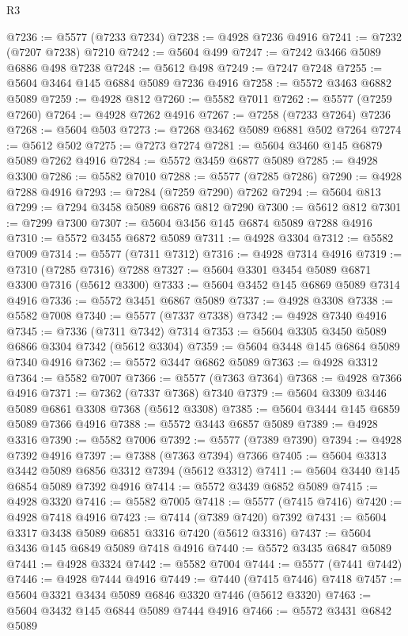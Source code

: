 \begin{lexlean}{R3}
\begin{coremodule}
@7236 := @5577 (@7233 @7234)
@7238 := @4928 @7236 @4916
@7241 := @7232 (@7207 @7238) @7210
@7242 := @5604 @499
@7247 := @7242 @3466 @5089 @6886 @498 @7238
@7248 := @5612 @498
@7249 := @7247 @7248
@7255 := @5604 @3464 @145 @6884 @5089 @7236 @4916
@7258 := @5572 @3463 @6882 @5089
@7259 := @4928 @812
@7260 := @5582 @7011
@7262 := @5577 (@7259 @7260)
@7264 := @4928 @7262 @4916
@7267 := @7258 (@7233 @7264) @7236
@7268 := @5604 @503
@7273 := @7268 @3462 @5089 @6881 @502 @7264
@7274 := @5612 @502
@7275 := @7273 @7274
@7281 := @5604 @3460 @145 @6879 @5089 @7262 @4916
@7284 := @5572 @3459 @6877 @5089
@7285 := @4928 @3300
@7286 := @5582 @7010
@7288 := @5577 (@7285 @7286)
@7290 := @4928 @7288 @4916
@7293 := @7284 (@7259 @7290) @7262
@7294 := @5604 @813
@7299 := @7294 @3458 @5089 @6876 @812 @7290
@7300 := @5612 @812
@7301 := @7299 @7300
@7307 := @5604 @3456 @145 @6874 @5089 @7288 @4916
@7310 := @5572 @3455 @6872 @5089
@7311 := @4928 @3304
@7312 := @5582 @7009
@7314 := @5577 (@7311 @7312)
@7316 := @4928 @7314 @4916
@7319 := @7310 (@7285 @7316) @7288
@7327 := @5604 @3301 @3454 @5089 @6871 @3300 @7316 (@5612 @3300)
@7333 := @5604 @3452 @145 @6869 @5089 @7314 @4916
@7336 := @5572 @3451 @6867 @5089
@7337 := @4928 @3308
@7338 := @5582 @7008
@7340 := @5577 (@7337 @7338)
@7342 := @4928 @7340 @4916
@7345 := @7336 (@7311 @7342) @7314
@7353 := @5604 @3305 @3450 @5089 @6866 @3304 @7342 (@5612 @3304)
@7359 := @5604 @3448 @145 @6864 @5089 @7340 @4916
@7362 := @5572 @3447 @6862 @5089
@7363 := @4928 @3312
@7364 := @5582 @7007
@7366 := @5577 (@7363 @7364)
@7368 := @4928 @7366 @4916
@7371 := @7362 (@7337 @7368) @7340
@7379 := @5604 @3309 @3446 @5089 @6861 @3308 @7368 (@5612 @3308)
@7385 := @5604 @3444 @145 @6859 @5089 @7366 @4916
@7388 := @5572 @3443 @6857 @5089
@7389 := @4928 @3316
@7390 := @5582 @7006
@7392 := @5577 (@7389 @7390)
@7394 := @4928 @7392 @4916
@7397 := @7388 (@7363 @7394) @7366
@7405 := @5604 @3313 @3442 @5089 @6856 @3312 @7394 (@5612 @3312)
@7411 := @5604 @3440 @145 @6854 @5089 @7392 @4916
@7414 := @5572 @3439 @6852 @5089
@7415 := @4928 @3320
@7416 := @5582 @7005
@7418 := @5577 (@7415 @7416)
@7420 := @4928 @7418 @4916
@7423 := @7414 (@7389 @7420) @7392
@7431 := @5604 @3317 @3438 @5089 @6851 @3316 @7420 (@5612 @3316)
@7437 := @5604 @3436 @145 @6849 @5089 @7418 @4916
@7440 := @5572 @3435 @6847 @5089
@7441 := @4928 @3324
@7442 := @5582 @7004
@7444 := @5577 (@7441 @7442)
@7446 := @4928 @7444 @4916
@7449 := @7440 (@7415 @7446) @7418
@7457 := @5604 @3321 @3434 @5089 @6846 @3320 @7446 (@5612 @3320)
@7463 := @5604 @3432 @145 @6844 @5089 @7444 @4916
@7466 := @5572 @3431 @6842 @5089

\end{coremodule}
\end{lexlean}
